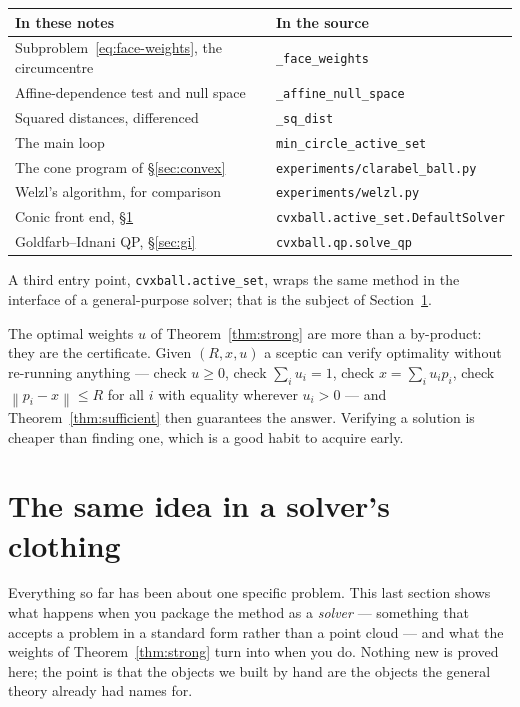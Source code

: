 \documentclass[11pt,a4paper]{article}
\theoremstyle{plain}
\theoremstyle{definition}
\theoremstyle{remark}
\newcommand{\norm}[1]{\left\lVert #1 \right\rVert}
\begin{document}
\begin{center}
\begin{tabular}{ll}
  \toprule
  \textbf{In these notes} & \textbf{In the source} \\
  \midrule
  Subproblem~\eqref{eq:face-weights}, the circumcentre & \texttt{\_face\_weights} \\
  Affine-dependence test and null space  & \texttt{\_affine\_null\_space} \\
  Squared distances, differenced         & \texttt{\_sq\_dist} \\
  The main loop                          & \texttt{min\_circle\_active\_set} \\
  The cone program of \S\ref{sec:convex} & \texttt{experiments/clarabel\_ball.py} \\
  Welzl's algorithm, for comparison      & \texttt{experiments/welzl.py} \\
  Conic front end, \S\ref{sec:frontend} & \texttt{cvxball.active\_set.DefaultSolver} \\
  Goldfarb--Idnani QP, \S\ref{sec:gi}   & \texttt{cvxball.qp.solve\_qp} \\
  \bottomrule
\end{tabular}
\end{center}

A third entry point, \texttt{cvxball.active\_set}, wraps the same method in the
interface of a general-purpose solver; that is the subject of
Section~\ref{sec:frontend}.

The optimal weights $u$ of Theorem~\ref{thm:strong} are more than a by-product:
they are the certificate. Given $(R,x,u)$ a sceptic can verify optimality without
re-running anything --- check $u\ge0$, check $\sum_i u_i = 1$, check
$x=\sum_i u_i p_i$, check $\norm{p_i-x}\le R$ for all $i$ with equality wherever
$u_i>0$ --- and Theorem~\ref{thm:sufficient} then guarantees the answer. Verifying
a solution is cheaper than finding one, which is a good habit to acquire early.

\section{The same idea in a solver's clothing}
\label{sec:frontend}

Everything so far has been about one specific problem. This last section shows
what happens when you package the method as a \emph{solver} --- something that
accepts a problem in a standard form rather than a point cloud --- and what the
weights of Theorem~\ref{thm:strong} turn into when you do. Nothing new is
proved here; the point is that the objects we built by hand are the objects the
general theory already had names for.
\end{document}
